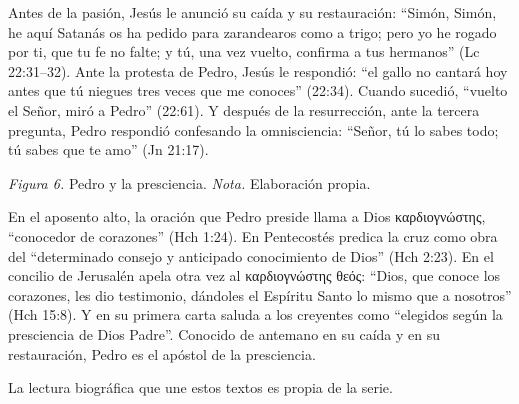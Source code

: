 \documentclass[11pt,letterpaper]{article}
\newcommand{\grc}[1]{\foreignlanguage{ancientgreek}{#1}}
\begin{document}
Antes de la pasión, Jesús le anunció su caída y su restauración: ``Simón, Simón, he aquí Satanás os ha pedido para zarandearos como a trigo; pero yo he rogado por ti, que tu fe no falte; y tú, una vez vuelto, confirma a tus hermanos'' (Lc 22:31--32). Ante la protesta de Pedro, Jesús le respondió: ``el gallo no cantará hoy antes que tú niegues tres veces que me conoces'' (22:34). Cuando sucedió, ``vuelto el Señor, miró a Pedro'' (22:61). Y después de la resurrección, ante la tercera pregunta, Pedro respondió confesando la omnisciencia: ``Señor, tú lo sabes todo; tú sabes que te amo'' (Jn 21:17).

\begin{center}
\par
{\footnotesize\color{gris}\textit{Figura 6.} Pedro y la presciencia. \textit{Nota.} Elaboración propia.}
\end{center}

En el aposento alto, la oración que Pedro preside llama a Dios \grc{καρδιογνώστης}, ``conocedor de corazones'' (Hch 1:24). En Pentecostés predica la cruz como obra del ``determinado consejo y anticipado conocimiento de Dios'' (Hch 2:23). En el concilio de Jerusalén apela otra vez al \grc{καρδιογνώστης θεός}: ``Dios, que conoce los corazones, les dio testimonio, dándoles el Espíritu Santo lo mismo que a nosotros'' (Hch 15:8). Y en su primera carta saluda a los creyentes como ``elegidos según la presciencia de Dios Padre''. Conocido de antemano en su caída y en su restauración, Pedro es el apóstol de la presciencia.

\begin{nota}[Precisión]
La lectura biográfica que une estos textos es propia de la serie.
\end{nota}
\end{document}
